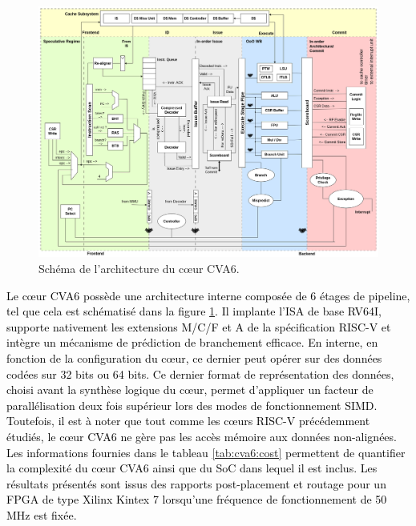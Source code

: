 \documentclass[../main.tex]{subfiles}
\begin{document}
\begin{figure}
    \centering
    \includegraphics[scale=0.3]{chapter4/ariane_overview.drawio.png}
    \caption{Schéma de l'architecture du cœur CVA6.}
    \label{figure:cva6}
\end{figure}
\textcolor{black}{Le cœur CVA6 possède une architecture interne composée de 6 étages de pipeline, tel que cela est schématisé dans la figure \ref{figure:cva6}.
Il implante l'ISA de base RV64I, supporte nativement les extensions M/C/F et A de la spécification RISC-V et intègre un mécanisme de prédiction de branchement efficace. En interne, en fonction de la configuration du cœur, ce dernier peut opérer sur des données codées sur 32 bits ou 64 bits.
Ce dernier format de représentation des données, choisi avant la synthèse logique du cœur, permet d'appliquer un facteur de parallélisation deux fois supérieur lors des modes de fonctionnement SIMD. Toutefois, il est à noter que tout comme les cœurs RISC-V précédemment étudiés, le cœur CVA6 ne gère pas les accès mémoire aux données non-alignées. Les informations fournies dans le tableau \ref{tab:cva6:cost} permettent de quantifier la complexité du cœur CVA6 ainsi que du SoC dans lequel il est inclus. Les résultats présentés sont issus des rapports post-placement et routage pour un FPGA de type Xilinx Kintex 7 lorsqu'une fréquence de fonctionnement de 50 MHz est fixée.}
\end{document}
